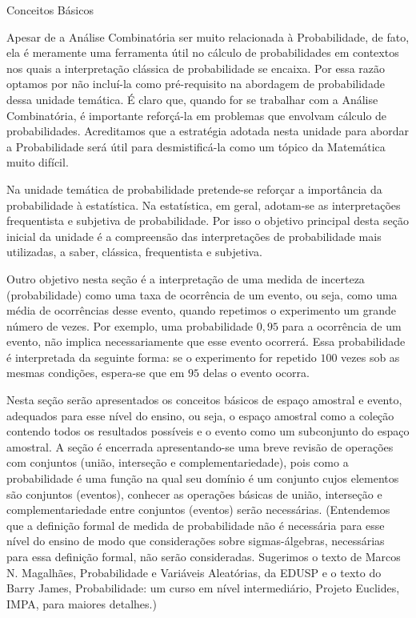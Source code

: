 \begin{paginatexto}{Conceitos Básicos}
{  Apesar de a Análise Combinatória ser muito relacionada à Probabilidade, de fato, ela é meramente uma ferramenta útil no cálculo de probabilidades em contextos nos quais a interpretação clássica de probabilidade se encaixa. Por essa razão optamos por não incluí-la como pré-requisito na abordagem de probabilidade dessa unidade temática. É claro que, quando for se trabalhar com a Análise Combinatória, é importante reforçá-la em problemas que envolvam cálculo de probabilidades. Acreditamos que a estratégia adotada nesta unidade para abordar a Probabilidade será útil para desmistificá-la como um tópico da Matemática muito difícil.

  Na unidade temática de probabilidade pretende-se reforçar a importância da probabilidade à estatística. Na estatística, em geral, adotam-se as interpretações frequentista e subjetiva de probabilidade. Por isso o objetivo principal desta seção inicial da unidade é a compreensão das interpretações de probabilidade mais utilizadas, a saber, clássica, frequentista e subjetiva.

  Outro objetivo nesta seção é a interpretação de uma medida de incerteza (probabilidade) como uma taxa de ocorrência de um evento, ou seja, como uma média de ocorrências desse evento, quando repetimos o experimento um grande número de vezes. Por exemplo, uma probabilidade $0{,}95$ para a ocorrência de um evento, não implica necessariamente que esse evento ocorrerá. Essa probabilidade é interpretada da seguinte forma: se o experimento for repetido $100$ vezes sob as mesmas condições, espera-se que em $95$ delas o evento ocorra.

  Nesta seção serão apresentados os conceitos básicos de espaço amostral e evento, adequados para esse nível do ensino, ou seja, o espaço amostral como a coleção contendo todos os resultados possíveis e o evento como um subconjunto do espaço amostral. A seção é encerrada apresentando-se uma breve revisão de operações com conjuntos (união, interseção e complementariedade), pois como a probabilidade é uma função na qual seu domínio é um conjunto cujos elementos são conjuntos (eventos), conhecer as operações básicas de união, interseção e complementariedade entre conjuntos (eventos) serão necessárias. (Entendemos que a definição formal de medida de probabilidade não é necessária para esse nível do ensino de modo que considerações sobre sigmas-álgebras, necessárias para essa definição formal, não serão consideradas. Sugerimos o texto de Marcos N. Magalhães, Probabilidade e Variáveis Aleatórias, da EDUSP e o texto do Barry James, Probabilidade: um curso em nível intermediário, Projeto Euclides, IMPA, para maiores detalhes.)

}
\end{paginatexto}
